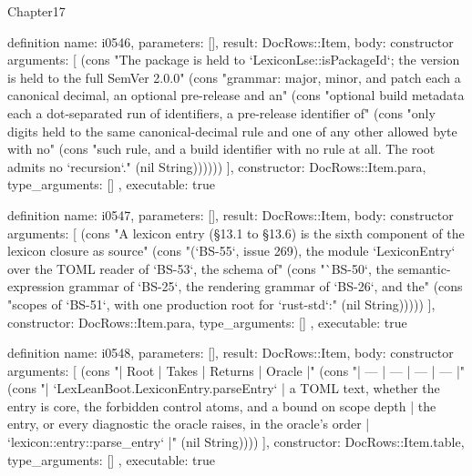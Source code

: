 \begin{lexlean}{Chapter17}
\begin{semanticmodule}
definition{
  name: i0546,
  parameters: [],
  result: DocRows::Item,
  body: constructor{
    arguments: [
      (cons "The package is held to `LexiconLse::isPackageId`; the version is held to the full SemVer 2.0.0" (cons "grammar: major, minor, and patch each a canonical decimal, an optional pre-release and an" (cons "optional build metadata each a dot-separated run of identifiers, a pre-release identifier of" (cons "only digits held to the same canonical-decimal rule and one of any other allowed byte with no" (cons "such rule, and a build identifier with no rule at all. The root admits no `recursion`." (nil String))))))
    ],
    constructor: DocRows::Item.para,
    type_arguments: []
  },
  executable: true
}

definition{
  name: i0547,
  parameters: [],
  result: DocRows::Item,
  body: constructor{
    arguments: [
      (cons "A lexicon entry (§13.1 to §13.6) is the sixth component of the lexicon closure as source" (cons "(`BS-55`, issue 269), the module `LexiconEntry` over the TOML reader of `BS-53`, the schema of" (cons "`BS-50`, the semantic-expression grammar of `BS-25`, the rendering grammar of `BS-26`, and the" (cons "scopes of `BS-51`, with one production root for `rust-std`:" (nil String)))))
    ],
    constructor: DocRows::Item.para,
    type_arguments: []
  },
  executable: true
}

definition{
  name: i0548,
  parameters: [],
  result: DocRows::Item,
  body: constructor{
    arguments: [
      (cons "| Root | Takes | Returns | Oracle |" (cons "| --- | --- | --- | --- |" (cons "| `LexLeanBoot.LexiconEntry.parseEntry` | a TOML text, whether the entry is core, the forbidden control atoms, and a bound on scope depth | the entry, or every diagnostic the oracle raises, in the oracle's order | `lexicon::entry::parse_entry` |" (nil String))))
    ],
    constructor: DocRows::Item.table,
    type_arguments: []
  },
  executable: true
}


\end{semanticmodule}
\end{lexlean}
